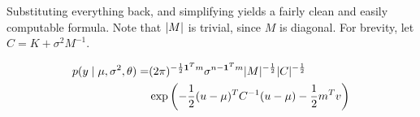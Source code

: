 \documentclass{article}
\newcommand{\one}{\mathbf{1}}
\DeclarePairedDelimiter{\Det}{\lvert}{\rvert}
\begin{document}
Substituting everything back, and simplifying yields a fairly clean and easily computable formula.
Note that $\Det{M}$ is trivial, since $M$ is diagonal.
For brevity, let $C = K + \sigma^2 M^{-1}$.

\begin{equation}
\begin{aligned}
    p(y \mid \mu, \sigma^2, \theta)
    = &
    (2 \pi)^{-\frac{1}{2} \one^T m}
    \sigma^{n - \one^T m}
    \Det{M}^{-\frac{1}{2}}
    \Det{C}^{-\frac{1}{2}}
    \\ &
    \exp\left(
        - \frac{1}{2} (u - \mu)^T C^{-1} (u - \mu)
        - \frac{1}{2} m^T v
    \right)
\end{aligned}
\end{equation}
\end{document}
